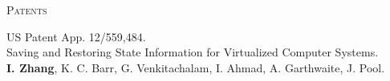 \documentclass[10pt,times]{report}
\newlength{\sectiongap}
\newlength{\sectioncolwidth}
\newlength{\colgap}
\newlength{\stuffwidth}
\newenvironment{rtable}{
  \begin{minipage}{\textwidth}
  }{
  \end{minipage}
}
\newenvironment{rsection}[1]{
  \begin{minipage}[t]{\sectioncolwidth}
    \textsc{#1}
  \end{minipage}
  \hspace{\colgap}
  \begin{minipage}[t]{\stuffwidth}
  }{
    \removelastskip
  \end{minipage}
  \\[\sectiongap]
}
\begin{document}
\begin{rtable}
  \vspace{1.0em}
  \begin{rsection}{Patents}
    US Patent App. 12/559,484.\\
    Saving and Restoring State Information for Virtualized Computer Systems.\\
    \textbf{I. Zhang}, K. C. Barr, G. Venkitachalam, I. Ahmad, A. Garthwaite, J. Pool.\\\vspace{-0.5em}
    
  \end{rsection}


\end{rtable}
\end{document}
